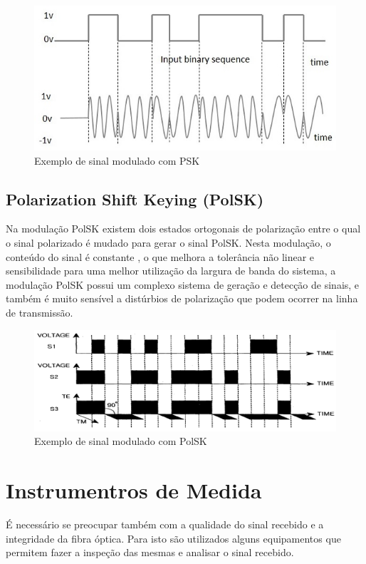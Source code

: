 \documentclass[article]{IEEEtran}
\begin{document}
\begin{figure}[h]
\includegraphics[width=\columnwidth]{psk.png}
\caption{Exemplo de sinal modulado com PSK}
\end{figure}

\subsection{Polarization Shift Keying (PolSK)}
Na modulação PolSK existem dois estados ortogonais de polarização entre o qual o sinal polarizado é mudado para gerar o sinal PolSK. Nesta modulação, o conteúdo do sinal é constante , o que melhora a tolerância não linear e sensibilidade para uma melhor utilização da largura de banda do sistema, a modulação PolSK possui um complexo sistema de geração e detecção de sinais, e também é muito sensível a distúrbios de polarização que podem ocorrer na linha de transmissão.
\begin{figure}[h]
\includegraphics[width=\columnwidth]{polsk.png}
\caption{Exemplo de sinal modulado com PolSK}
\end{figure}

\section{Instrumentros de Medida}
É necessário se preocupar também com a qualidade do sinal recebido e a integridade da fibra óptica. Para isto são utilizados alguns equipamentos que permitem fazer a inspeção das mesmas e analisar o sinal recebido.
\end{document}
